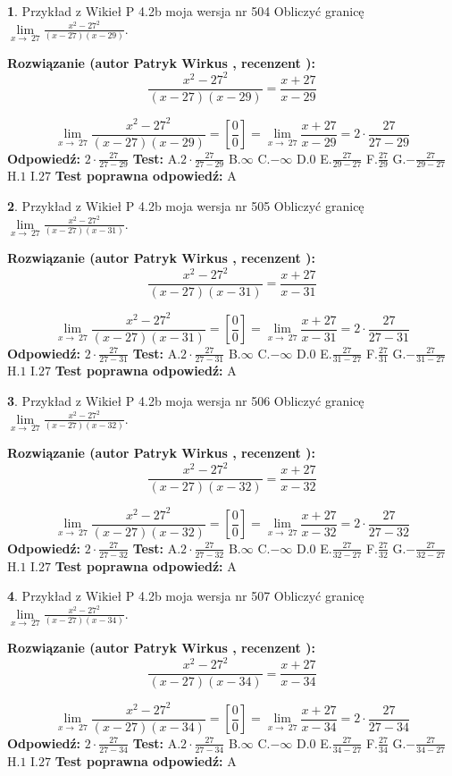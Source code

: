 \documentclass[12pt, a4paper]{article}
\theoremstyle{definition} %
\newtheorem{zad}{}
\newcommand{\zadStart}[1]{\begin{zad}#1\newline}
\newcommand{\zadStop}{\end{zad}}
\newcommand{\rozwStart}[2]{\noindent \textbf{Rozwiązanie (autor #1 , recenzent #2): }\newline}
\newcommand{\rozwStop}{\newline}
\newcommand{\odpStart}{\noindent \textbf{Odpowiedź:}\newline}
\newcommand{\odpStop}{\newline}
\newcommand{\testStart}{\noindent \textbf{Test:}\newline}
\newcommand{\testStop}{\newline}
\newcommand{\kluczStart}{\noindent \textbf{Test poprawna odpowiedź:}\newline}
\newcommand{\kluczStop}{\newline}
\begin{document}
\zadStart{Przykład z Wikieł P 4.2b moja wersja nr 504}
Obliczyć granicę $\lim\limits_{x\to\ 27}\frac{x^{2}-27^{2}}{(x-27)(x-29)}$.
\zadStop
\rozwStart{Patryk Wirkus}{}
$$\frac{x^{2}-27^{2}}{(x-27)(x-29)}=\frac{x+27}{x-29}$$

$$\lim\limits_{x\to\ 27}\frac{x^{2}-27^{2}}{(x-27)(x-29)}=[\frac{0}{0}]=\lim\limits_{x\to\ 27}\frac{x+27}{x-29}=2 \cdot \frac{27}{27-29}$$
\rozwStop
\odpStart
$2 \cdot \frac{27}{27-29}$
\odpStop
\testStart
A.$2 \cdot \frac{27}{27-29}$
B.$\infty$
C.$-\infty$
D.$0$
E.$\frac{27}{29-27}$
F.$\frac{27}{29}$
G.$-\frac{27}{29-27}$
H.$1$
I.$27$
\testStop
\kluczStart
A
\kluczStop



\zadStart{Przykład z Wikieł P 4.2b moja wersja nr 505}
Obliczyć granicę $\lim\limits_{x\to\ 27}\frac{x^{2}-27^{2}}{(x-27)(x-31)}$.
\zadStop
\rozwStart{Patryk Wirkus}{}
$$\frac{x^{2}-27^{2}}{(x-27)(x-31)}=\frac{x+27}{x-31}$$

$$\lim\limits_{x\to\ 27}\frac{x^{2}-27^{2}}{(x-27)(x-31)}=[\frac{0}{0}]=\lim\limits_{x\to\ 27}\frac{x+27}{x-31}=2 \cdot \frac{27}{27-31}$$
\rozwStop
\odpStart
$2 \cdot \frac{27}{27-31}$
\odpStop
\testStart
A.$2 \cdot \frac{27}{27-31}$
B.$\infty$
C.$-\infty$
D.$0$
E.$\frac{27}{31-27}$
F.$\frac{27}{31}$
G.$-\frac{27}{31-27}$
H.$1$
I.$27$
\testStop
\kluczStart
A
\kluczStop



\zadStart{Przykład z Wikieł P 4.2b moja wersja nr 506}
Obliczyć granicę $\lim\limits_{x\to\ 27}\frac{x^{2}-27^{2}}{(x-27)(x-32)}$.
\zadStop
\rozwStart{Patryk Wirkus}{}
$$\frac{x^{2}-27^{2}}{(x-27)(x-32)}=\frac{x+27}{x-32}$$

$$\lim\limits_{x\to\ 27}\frac{x^{2}-27^{2}}{(x-27)(x-32)}=[\frac{0}{0}]=\lim\limits_{x\to\ 27}\frac{x+27}{x-32}=2 \cdot \frac{27}{27-32}$$
\rozwStop
\odpStart
$2 \cdot \frac{27}{27-32}$
\odpStop
\testStart
A.$2 \cdot \frac{27}{27-32}$
B.$\infty$
C.$-\infty$
D.$0$
E.$\frac{27}{32-27}$
F.$\frac{27}{32}$
G.$-\frac{27}{32-27}$
H.$1$
I.$27$
\testStop
\kluczStart
A
\kluczStop



\zadStart{Przykład z Wikieł P 4.2b moja wersja nr 507}
Obliczyć granicę $\lim\limits_{x\to\ 27}\frac{x^{2}-27^{2}}{(x-27)(x-34)}$.
\zadStop
\rozwStart{Patryk Wirkus}{}
$$\frac{x^{2}-27^{2}}{(x-27)(x-34)}=\frac{x+27}{x-34}$$

$$\lim\limits_{x\to\ 27}\frac{x^{2}-27^{2}}{(x-27)(x-34)}=[\frac{0}{0}]=\lim\limits_{x\to\ 27}\frac{x+27}{x-34}=2 \cdot \frac{27}{27-34}$$
\rozwStop
\odpStart
$2 \cdot \frac{27}{27-34}$
\odpStop
\testStart
A.$2 \cdot \frac{27}{27-34}$
B.$\infty$
C.$-\infty$
D.$0$
E.$\frac{27}{34-27}$
F.$\frac{27}{34}$
G.$-\frac{27}{34-27}$
H.$1$
I.$27$
\testStop
\kluczStart
A
\kluczStop
\end{document}
